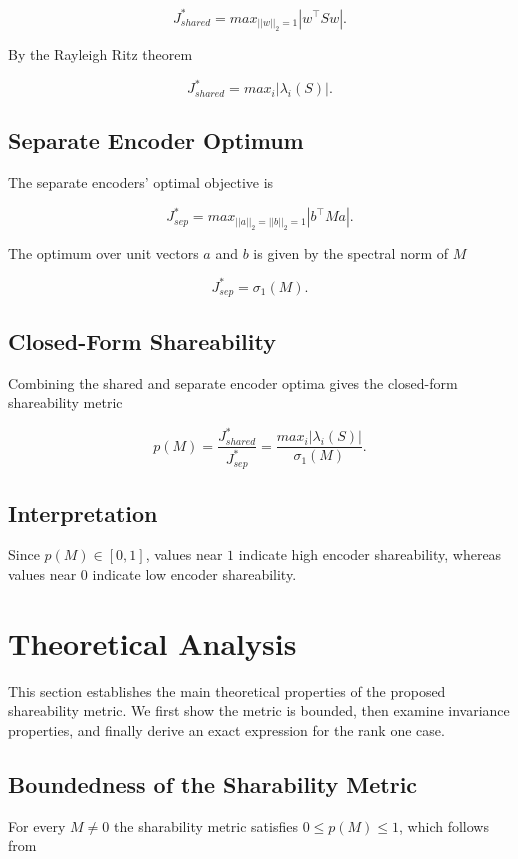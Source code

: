 \documentclass{article}
\begin{document}
\[
J_{shared}^* = max_{||w||_2=1}|w^\top S w|.
\]

By the Rayleigh Ritz theorem \cite{trefethen1997numerical}

\[
J_{shared}^* = max_{i}|\lambda_i(S)|.
\]

\subsection{Separate Encoder Optimum}

The separate encoders' optimal objective is

\[
J_{sep}^* = max_{||a||_2=||b||_2=1}|b^\top M a|.
\]

The optimum over unit vectors \(a\) and \(b\) is given by the spectral norm of \(M\)

\[
J_{sep}^* = \sigma_1(M).
\]

\subsection{Closed-Form Shareability}

Combining the shared and separate encoder optima gives the closed-form shareability metric

\[
p(M) = \frac{J_{shared}^*}{J_{sep}^*} = \frac{max_i|\lambda_i(S)|}{\sigma_1(M)}.
\]

\subsection{Interpretation}

Since \(p(M) \in [0, 1]\), values near \(1\) indicate high encoder shareability, whereas values near \(0\) indicate low encoder shareability.

\section{Theoretical Analysis}

This section establishes the main theoretical properties of the proposed shareability metric. We first show the metric is bounded, then examine invariance properties, and finally derive an exact expression for the rank one case.


\subsection{Boundedness of the Sharability Metric}
For every \(M \neq 0\) the sharability metric satisfies \(0 \leq p(M) \leq 1\), which follows from
\end{document}
